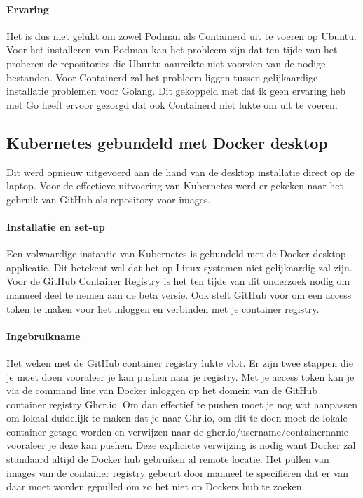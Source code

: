 \begin{itemize}
\paragraph{Ervaring}
Het is dus niet gelukt om zowel Podman als Containerd uit te voeren op Ubuntu. Voor het installeren van Podman kan het probleem zijn dat ten tijde van het proberen de repositories die Ubuntu aanreikte niet voorzien van de nodige bestanden. Voor Containerd zal het probleem liggen tussen gelijkaardige installatie problemen voor Golang. Dit gekoppeld met dat ik geen ervaring heb met Go heeft ervoor gezorgd dat ook Containerd niet lukte om uit te voeren.

\subsection{Kubernetes gebundeld met Docker desktop}
Dit werd opnieuw uitgevoerd aan de hand van de desktop installatie direct op de laptop. Voor de effectieve uitvoering van Kubernetes werd er gekeken naar het gebruik van GitHub als repository voor images.
\paragraph{Installatie en set-up}
Een volwaardige instantie van Kubernetes is gebundeld met de Docker desktop applicatie. Dit betekent wel dat het op Linux systemen niet gelijkaardig zal zijn.
Voor de GitHub Container Registry is het ten tijde van dit onderzoek nodig om manueel deel te nemen aan de beta versie. Ook stelt GitHub voor om een access token te maken voor het inloggen en verbinden met je container registry.

\paragraph{Ingebruikname}
Het weken met de GitHub container registry lukte vlot. Er zijn twee stappen die je moet doen vooraleer je kan pushen naar je registry. Met je access token kan je via de command line van Docker inloggen op het domein van de GitHub container registry Ghcr.io. Om dan effectief te pushen moet je nog wat aanpassen om lokaal duidelijk te maken dat je naar Ghr.io, om dit te doen moet de lokale container getagd worden en verwijzen naar de ghcr.io/username/containername vooraleer je deze kan pushen. Deze expliciete verwijzing is nodig want Docker zal standaard altijd de Docker hub gebruiken al remote locatie. Het pullen van images van de container registry gebeurt door manueel te specifiëren dat er van daar moet worden gepulled om zo het niet op Dockers hub te zoeken.


\end{itemize}
